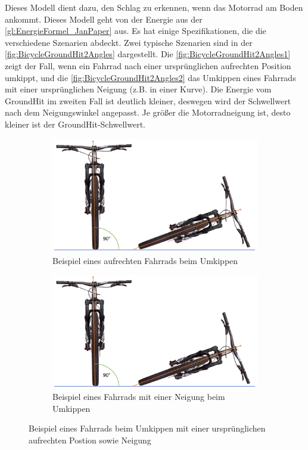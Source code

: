 Dieses Modell dient dazu, den Schlag zu erkennen, wenn das Motorrad am Boden ankommt. Dieses Modell geht von der Energie aus der \autoref{gl:EnergieFormel_JanPaper} aus. Es hat einige Spezifikationen, die die verschiedene Szenarien abdeckt. Zwei typische Szenarien sind in der \autoref{fig:BicycleGroundHit2Angles} dargestellt. Die \autoref{fig:BicycleGroundHit2Angles1} zeigt der Fall, wenn ein Fahrrad nach einer ursprünglichen aufrechten Position umkippt, und die \autoref{fig:BicycleGroundHit2Angles2} das Umkippen eines Fahrrads mit einer ursprünglichen Neigung (z.B. in einer Kurve).
Die Energie vom GroundHit im zweiten Fall ist deutlich kleiner, deswegen wird der Schwellwert nach dem Neigungswinkel angepasst. Je größer die Motorradneigung ist, desto kleiner ist der GroundHit-Schwellwert.\\

\begin{figure}[H]
	\centering
	\begin{subfigure}{0.49\textwidth}
		\centering
		\includegraphics[page = 1, width=\textwidth]{Bilder/BicycleGroundHit2Angles.pdf}
		\caption{Beispiel eines aufrechten Fahrrads beim Umkippen}
		\label{fig:BicycleGroundHit2Angles1}
	\end{subfigure}
	\begin{subfigure}{0.49\textwidth}
		\centering
		\includegraphics[page = 2, width=\textwidth]{Bilder/BicycleGroundHit2Angles.pdf}
		\caption{Beispiel eines Fahrrads mit einer Neigung beim Umkippen}
		\label{fig:BicycleGroundHit2Angles2}
	\end{subfigure}
	\caption{Beispiel eines Fahrrads beim Umkippen mit einer ursprünglichen aufrechten Postion sowie Neigung}
	\label{fig:BicycleGroundHit2Angles}
\end{figure}

